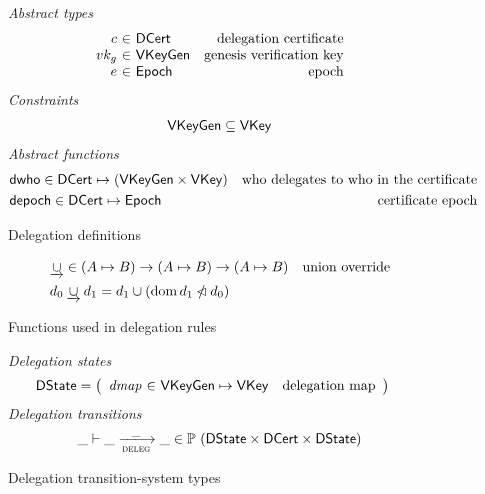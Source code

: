 \begin{figure}
  \emph{Abstract types}
  \begin{equation*}
    \begin{array}{r@{~\in~}lr}
      c & \DCert & \text{delegation certificate}\\
      vk_g & \VKeyGen & \text{genesis verification key}\\
      e & \Epoch & \text{epoch}\\
    \end{array}
  \end{equation*}
  \emph{Constraints}
  \begin{align*}
    \mathsf{VKeyGen} \subseteq \mathsf{VKey}
  \end{align*}
  \emph{Abstract functions}
  \begin{align*}
    & \mathsf{dwho} \in \mathsf{DCert} \mapsto (\mathsf{VKeyGen} \times \mathsf{VKey}) & \text{who delegates to who in the certificate}\\
    & \mathsf{depoch} \in \mathsf{DCert} \mapsto \mathsf{Epoch} & \text{certificate epoch}
  \end{align*}
  \caption{Delegation definitions}
  \label{fig:defs:delegation}
\end{figure}

\begin{figure}
  \begin{align*}
    & \mathbin{\underrightarrow\cup} \in (A \mapsto B) \to (A \mapsto B) \to (A \mapsto B)
    & \text{union override}\\
    & d_0 \mathbin{\underrightarrow\cup} d_1 = d_1 \cup (\operatorname{dom} d_1 \mathbin{\slashed{\lhd}} d_0)
  \end{align*}
  \caption{Functions used in delegation rules}
  \label{fig:funcs:delegation}
\end{figure}

\begin{figure}
  \emph{Delegation states}
  \begin{align*}
    & \DState
      = \left(
        \begin{array}{r@{~\in~}lr}
          \var{dmap} & \VKeyGen \mapsto \VKey & \text{delegation map}
        \end{array}\right)
  \end{align*}
  \emph{Delegation transitions}
  \begin{equation*}
    \_ \vdash \_ \trans{deleg}{\_} \_ \in
      \powerset (\DState \times \DCert \times \DState)
    \end{equation*}
  \caption{Delegation transition-system types}
  \label{fig:ts-types:delegation}
\end{figure}

